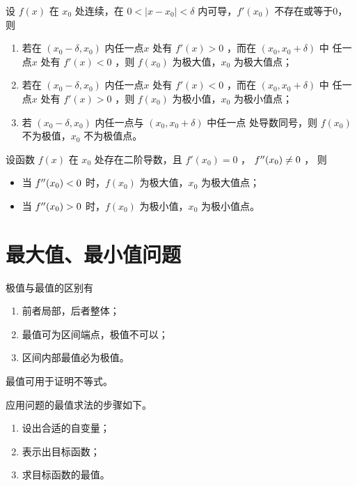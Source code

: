 \begin{Theo}[极值第一充分条件]

    设 $ f(x) $ 在 $ x_0 $ 处连续，在 $ 0<|x-x_0|<\delta $ 内可导，$ f'(x_0) $ 不存在或等于0，则
    \begin{enumerate}
        \item 若在 $ (x_0-\delta,x_0) $ 内任一点$ x $ 处有 $ f'(x)>0 $ ，而在 $ (x_0,x_0+\delta) $ 中
        任一点$ x $ 处有 $ f'(x)<0 $ ，则 $ f(x_0) $ 为极大值，$ x_0 $ 为极大值点；
        \item 若在 $ (x_0-\delta,x_0) $ 内任一点$ x $ 处有 $ f'(x)<0 $ ，而在 $ (x_0,x_0+\delta) $ 中
        任一点$ x $ 处有 $ f'(x)>0 $ ，则 $ f(x_0) $ 为极小值，$ x_0 $ 为极小值点；
        \item 若 $ (x_0-\delta,x_0) $ 内任一点与 $ (x_0,x_0+\delta) $ 中任一点
        处导数同号，则 $ f(x_0) $ 不为极值，$ x_0 $ 不为极值点。
    \end{enumerate}
\end{Theo}

\begin{Theo}[极值第二充分条件]

    设函数 $ f(x) $ 在 $ x_0 $ 处存在二阶导数，且 $ f'(x_0)=0 $ ， $ f^{\prime\prime}(x_0)\neq 0 $ ，
    则\begin{itemize}
        \item 当 $ f^{\prime\prime}(x_0)<0 $ 时，$ f(x_0) $ 为极大值，$ x_0 $ 为极大值点；
        \item 当 $ f^{\prime\prime}(x_0)>0 $ 时，$ f(x_0) $ 为极小值，$ x_0 $ 为极小值点。
    \end{itemize}
\end{Theo}

\section{最大值、最小值问题}

极值与最值的区别有\begin{enumerate}
    \item 前者局部，后者整体；
    \item 最值可为区间端点，极值不可以；
    \item 区间内部最值必为极值。
\end{enumerate}

最值可用于证明不等式。

应用问题的最值求法的步骤如下。
\begin{enumerate}
    \item 设出合适的自变量；
    \item 表示出目标函数；
    \item 求目标函数的最值。
\end{enumerate}

